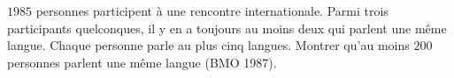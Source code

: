 $1985$ personnes participent à une rencontre internationale. Parmi trois participants quelconques, il y en a toujours au moins deux qui parlent une même langue. Chaque personne parle au plus cinq langues. Montrer qu'au moins $200$ personnes parlent une même langue (BMO 1987).

